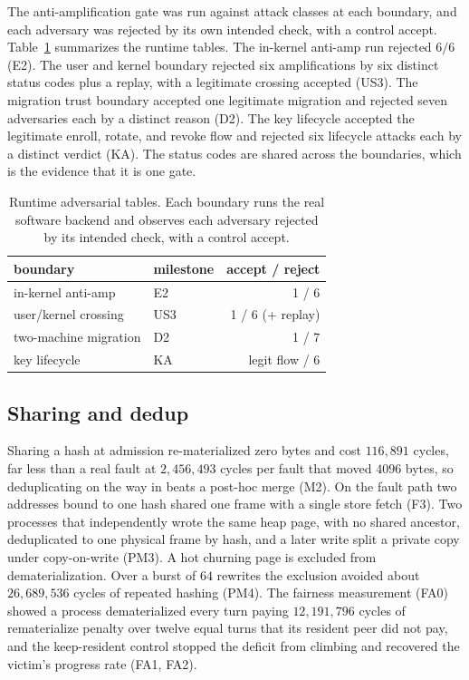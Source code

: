 \documentclass[10pt,twocolumn]{article}
\begin{document}
The anti-amplification gate was run against attack classes at each boundary, and
each adversary was rejected by its own intended check, with a control accept.
Table~\ref{tab:adv} summarizes the runtime tables. The in-kernel anti-amp run
rejected $6/6$ (E2). The user and kernel boundary rejected six amplifications by
six distinct status codes plus a replay, with a legitimate crossing accepted
(US3). The migration trust boundary accepted one legitimate migration and rejected
seven adversaries each by a distinct reason (D2). The key lifecycle accepted the
legitimate enroll, rotate, and revoke flow and rejected six lifecycle attacks each
by a distinct verdict (KA). The status codes are shared across the boundaries,
which is the evidence that it is one gate.

\begin{table}[t]
\centering
\caption{Runtime adversarial tables. Each boundary runs the real software backend
and observes each adversary rejected by its intended check, with a control accept.}
\label{tab:adv}
\small
\begin{tabular}{llr}
\toprule
boundary & milestone & accept / reject \\
\midrule
in-kernel anti-amp & E2  & 1 / 6 \\
user/kernel crossing & US3 & 1 / 6 (+ replay) \\
two-machine migration & D2 & 1 / 7 \\
key lifecycle & KA & legit flow / 6 \\
\bottomrule
\end{tabular}
\end{table}

\subsection{Sharing and dedup}

Sharing a hash at admission re-materialized zero bytes and cost $116{,}891$
cycles, far less than a real fault at $2{,}456{,}493$ cycles per fault that moved
$4096$ bytes, so deduplicating on the way in beats a post-hoc merge (M2). On the
fault path two addresses bound to one hash shared one frame with a single store
fetch (F3). Two processes that independently wrote the same heap page, with no
shared ancestor, deduplicated to one physical frame by hash, and a later write
split a private copy under copy-on-write (PM3). A hot churning page is excluded
from dematerialization. Over a burst of $64$ rewrites the exclusion avoided about
$26{,}689{,}536$ cycles of repeated hashing (PM4). The fairness measurement (FA0)
showed a process dematerialized every turn paying $12{,}191{,}796$ cycles of
rematerialize penalty over twelve equal turns that its resident peer did not pay,
and the keep-resident control stopped the deficit from climbing and recovered the
victim's progress rate (FA1, FA2).
\end{document}
